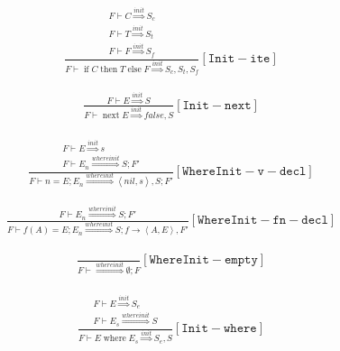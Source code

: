\documentclass{scrartcl}
\DeclareMathOperator{\ifop}{if}
\DeclareMathOperator{\thenop}{then}
\DeclareMathOperator{\elseop}{else}
\DeclareMathOperator{\where}{where}
\DeclareMathOperator{\nextop}{next}
\begin{document}
    \begin{align*}
    \frac{
        \begin{matrix}
        F \vdash C \overset{init}{\Rightarrow} S_c \\
        F \vdash T \overset{init}{\Rightarrow} S_t \\
        F \vdash F \overset{init}{\Rightarrow} S_f
        \end{matrix}
    }{
        F \vdash \ifop C \thenop T \elseop F \overset{init}{\Rightarrow} S_c, S_t, S_f
    }[\mathtt{Init-ite}]
    \end{align*}
    
    \begin{align*}
    \frac{
        F \vdash E \overset{init}{\Rightarrow} S
    }{
        F \vdash \nextop E \overset{init}{\Rightarrow} false, S
    }[\mathtt{Init-next}]
    \end{align*}
    
    \begin{align*}
    \frac{
        \begin{matrix}
        F \vdash E \overset{init}{\Rightarrow} s \\
        F \vdash E_n \overset{whereinit}{\Rightarrow} S; F'
        \end{matrix}
    }{
        F \vdash n = E; E_n \overset{whereinit}{\Rightarrow} \left<nil, s\right>, S; F'
    }[\mathtt{WhereInit-v-decl}]
    \end{align*}
    
    \begin{align*}
    \frac{
        F \vdash E_n \overset{whereinit}{\Rightarrow} S; F'
    }{
        F \vdash f(A) = E; E_n \overset{whereinit}{\Rightarrow} S; f \to \left<A, E \right>, F'
    }[\mathtt{WhereInit-fn-decl}]
    \end{align*}
    
    \begin{align*}
    \frac{}{
        F \vdash \overset{whereinit}{\Rightarrow} \emptyset; F
    }[\mathtt{WhereInit-empty}]
    \end{align*}
    
    \begin{align*}
    \frac{
        \begin{matrix}
        F \vdash E \overset{init}{\Rightarrow} S_e \\
        F \vdash E_s \overset{whereinit}{\Rightarrow} S
        \end{matrix}
    }{
        F \vdash E \where E_s \overset{init}{\Rightarrow} S_e, S
    }[\mathtt{Init-where}]
    \end{align*}
    
\end{document}
